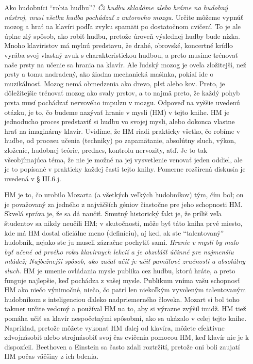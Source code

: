 Ako hudobníci “robia hudbu”? \emph{Či hudbu skladáme alebo hráme na hudobný nástroj, musí všetka hudba pochádzať z autorovho mozgu.} Určite môžeme vypnúť mozog a hrať na klavíri podľa zvyku spamäti po dostatočnom cvičení. To je ale úplne zlý spôsob, ako robiť hudbu, pretože úroveň výslednej hudby bude nízka. Mnoho klaviristov má mylnú predstavu, že drahé, obrovské, koncertné krídlo vyrába svoj vlastný zvuk s charakteristickou hudbou, a preto musíme trénovať naše prsty na učenie sa hrania na klavír. Ale ľudský mozog je oveľa zložitejší, než prsty a tomu nadradený, ako žiadna mechanická mašinka, pokiaľ ide o muzikálnosť. Mozog nemá obmedzenia ako drevo, plsť alebo kov. Preto, je dôležitejšie trénovať mozog ako svaly prstov, a to najmä preto, že každý pohyb prsta musí pochádzať nervového impulzu v mozgu. Odpoveď na vyššie uvedenú otázku, je to, čo budeme nazývať hranie v mysli (HM) v tejto knihe. HM je jednoducho proces predstaviť si hudbu vo svojej mysli, alebo dokonca vlastne hrať na imaginárny klavír. Uvidíme, že HM riadi prakticky všetko, čo robíme v hudbe, od procesu učenia (techniky) po zapamätanie, absolútny sluch, výkon, zloženie, hudobnej teórie, prednes, kontrolu nervozity, atď. Je to tak všeobjímajúca téma, že nie je možné na jej vysvetlenie venovať jeden oddiel, ale je to popísané v prakticky každej časti tejto knihy. Pomerne rozšírená diskusia je uvedená v § III.6.j.

HM je to, čo urobilo Mozarta (a všetkých veľkých hudobníkov) tým, čím bol; on je považovaný za jedného z najväčších géniov čiastočne pre jeho schopnosti HM. Skvelá správa je, že sa dá naučiť. Smutný historický fakt je, že príliš veľa študentov sa nikdy neučili HM; v skutočnosti, môže byť táto kniha prvé miesto, kde má HM dostal oficiálne meno (definíciu), aj keď, ak ste “talentovaný” hudobník, nejako ste ju museli zázračne pochytiť sami. \emph{Hranie v mysli by malo byť učené od prvého roku klavírnych lekcií a je obzvlášť účinné pre najmenšiu mládež; Najbežnejší spôsob, ako začať učiť je učiť pamäťové zručnosti a absolútny sluch.} HM je umenie ovládania mysle publika cez hudbu, ktorú hráte, a preto funguje najlepšie, keď pochádza z vašej mysle. Publikum vníma vašu schopnosť HM ako niečo výnimočné, niečo, čo patrí len niekoľkým vyvoleným talentovaným hudobníkom s inteligenciou ďaleko nadpriemerného človeka. Mozart si bol toho takmer určite vedomý a používal HM na to, aby si výrazne zvýšil imidž. HM tiež pomáha učiť sa klavír nespočetnými spôsobmi, ako sa ukázalo v celej tejto knihe. Napríklad, pretože môžete vykonať HM ďalej od klavíra, môžete efektívne zdvojnásobiť alebo strojnásobiť svoj čas cvičenia pomocou HM, keď klavír nie je k dispozícii. Beethoven a Einstein sa často zdali roztržití, pretože oni boli zaujatí HM počas väčšiny z ich bdenia.

